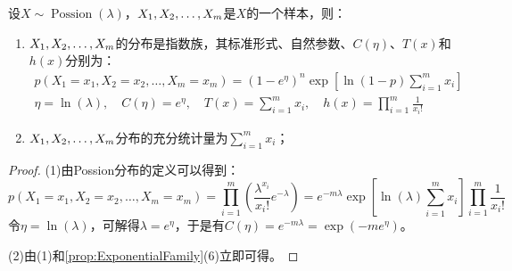\begin{theorem}
	设$X\sim\operatorname{Possion}(\lambda)$，$X_1, X_2, \dots, X_{m}$是$X$的一个样本，则：
	\begin{enumerate}
		\item $X_1, X_2, \dots, X_{m}$的分布是指数族，其标准形式、自然参数、$C(\eta)$、$T(x)$和$h(x)$分别为：
		\begin{gather*}
			p(X_1=x_1,X_2=x_2,\dots,X_m=x_m)=(1-e^{\eta})^n\exp\left[\ln(1-p)\sum_{i=1}^{m}x_i\right] \\
			\eta=\ln(\lambda),\quad C(\eta)=e^{\eta},\quad T(x)=\sum_{i=1}^{m}x_i,\quad h(x)=\prod_{i=1}^{m}\frac{1}{x_i!}
		\end{gather*}
		\item $X_1, X_2, \dots, X_{m}$分布的充分统计量为$\sum\limits_{i=1}^{m}x_i$；
	\end{enumerate}
\end{theorem}
\begin{proof}
	(1)由Possion分布的定义可以得到：
	\begin{equation*}
		p(X_1=x_1,X_2=x_2,\dots,X_m=x_m)=\prod_{i=1}^{m}\left(\frac{\lambda^{x_i}}{x_i!}e^{-\lambda}\right)=e^{-m\lambda}\exp\left[\ln(\lambda)\sum_{i=1}^{m}x_i\right]\prod_{i=1}^{m}\frac{1}{x_i!}
	\end{equation*}
	令$\eta=\ln(\lambda)$，可解得$\lambda=e^{\eta}$，于是有$C(\eta)=e^{-m\lambda}=\exp(-me^{\eta})$。\par
	(2)由(1)和\cref{prop:ExponentialFamily}(6)立即可得。
\end{proof}


